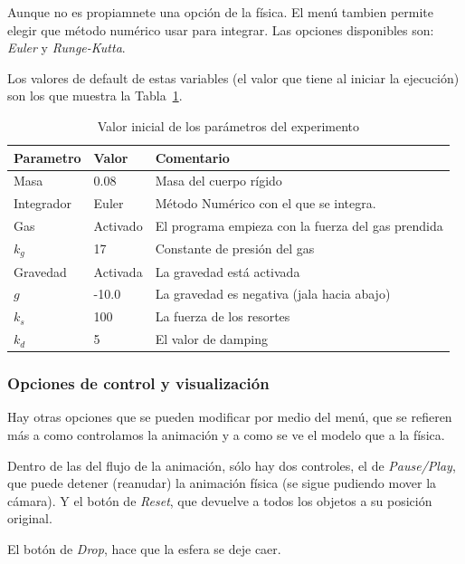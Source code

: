 Aunque no es propiamnete una opción de la física. El menú tambien permite elegir que método numérico usar para integrar.
Las opciones disponibles son: \emph{Euler} y \emph{Runge-Kutta}.

Los valores de default de estas variables (el valor que tiene al iniciar la ejecución) son los que muestra la Tabla~\ref{valores:variables}.

\begin{table}
\begin{center}
\begin{tabular} {@{}llp{10cm}@{}}
\toprule
Parametro & Valor & Comentario\\
\midrule
 Masa & 0.08 & Masa del cuerpo rígido \\
 Integrador & Euler & Método Numérico con el que se integra. \\
 Gas & Activado & El programa empieza con la fuerza del gas prendida \\
 $k_g$ & 17 & Constante de presión del gas \\
 Gravedad & Activada & La gravedad está activada \\
 $g$ & -10.0 & La gravedad es negativa (jala hacia abajo) \\
 $k_s$ & 100 & La fuerza de los resortes \\
 $k_d$ & 5 & El valor de damping \\
\bottomrule
\end{tabular}
\end{center}
\caption[Tabla con los valores de defecto de los parámetros]{Valor inicial de los parámetros del experimento}
\label{valores:variables}
\end{table}

\subsubsection{Opciones de control y visualización}
Hay otras opciones que se pueden modificar por medio del menú, que se refieren más a como controlamos la animación y a como se ve el modelo que a la física.

Dentro de las del flujo de la animación, sólo hay dos controles, el de \emph{\textenglish{Pause/Play}}, que puede detener (reanudar) la animación física (se sigue pudiendo mover la cámara).
Y el botón de \emph{\textenglish{Reset}}, que devuelve a todos los objetos a su posición original.

El botón de \emph{\textenglish{Drop}}, hace que la esfera se deje caer.

